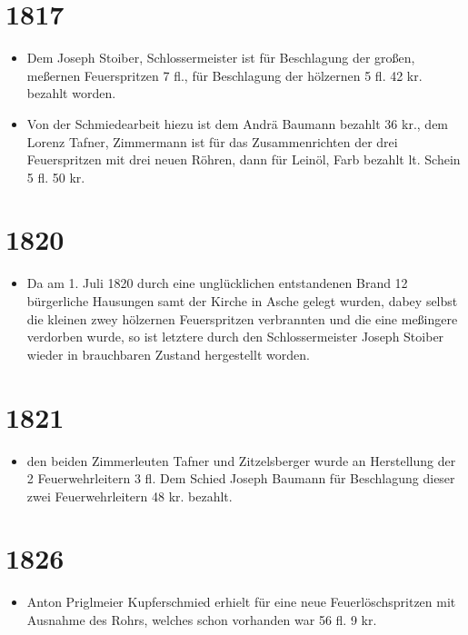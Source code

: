 \documentclass[12pt,a4paper]{book}
\begin{document}
\section*{1817}

\begin{itemize}
\item Dem Joseph Stoiber, Schlossermeister ist für Beschlagung der großen,
meßernen Feuerspritzen 7 fl., für Beschlagung der hölzernen 5 fl. 42 kr. bezahlt
worden.

\item Von der Schmiedearbeit hiezu ist dem Andrä Baumann bezahlt 36 kr., dem
Lorenz Tafner, Zimmermann ist für das Zusammenrichten der drei Feuerspritzen mit
drei neuen Röhren, dann für Leinöl, Farb bezahlt lt. Schein 5 fl. 50 kr.
\end{itemize}

\section*{1820}

\begin{itemize}
\item Da am 1. Juli 1820 durch eine unglücklichen entstandenen Brand 12
bürgerliche Hausungen samt der Kirche in Asche gelegt wurden, dabey selbst die
kleinen zwey hölzernen Feuerspritzen verbrannten und die eine meßingere
verdorben wurde, so ist letztere durch den Schlossermeister Joseph Stoiber
wieder in brauchbaren Zustand hergestellt worden.
\end{itemize}

\section*{1821}

\begin{itemize}
\item den beiden Zimmerleuten Tafner und Zitzelsberger wurde an Herstellung der
2 Feuerwehrleitern 3 fl. Dem Schied Joseph Baumann für Beschlagung dieser zwei
Feuerwehrleitern 48 kr. bezahlt.
\end{itemize}

\section*{1826}

\begin{itemize}
\item Anton Priglmeier Kupferschmied erhielt für eine neue Feuerlöschspritzen
mit Ausnahme des Rohrs, welches schon vorhanden war 56 fl. 9 kr.
\end{itemize}
\end{document}
